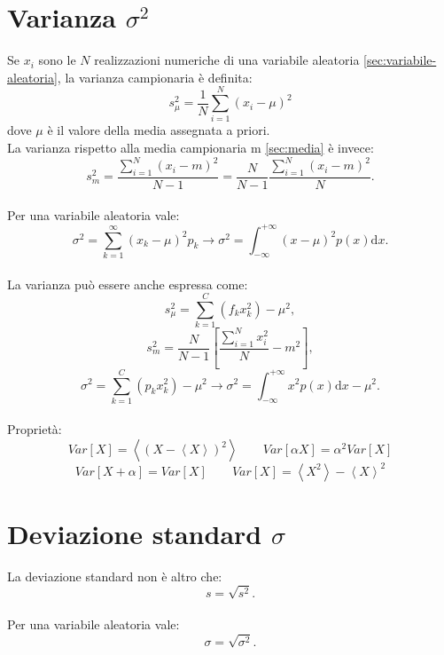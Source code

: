 \section{Varianza $\sigma^2$} %
\label{sec:varianza}
Se $x_{i}$ sono le $N$ realizzazioni numeriche di una variabile aleatoria \ref{sec:variabile-aleatoria}, la varianza campionaria è definita:
\begin{equation}
{ s }_{ \mu  }^{ 2 }=\frac { 1 }{ N } \sum _{ i=1 }^{ N }{ { ({ x }_{ i }-\mu ) }^{ 2 } }
\end{equation}
dove $\mu$ è il valore della media assegnata a priori. \\ La varianza rispetto alla media campionaria m \ref{sec:media} è invece:
\begin{equation}
{ s }_{ m }^{ 2 }=\frac { \sum _{ i=1 }^{ N }{ { ({ x }_{ i }-m) }^{ 2 } }  }{ N-1 } =\frac { N }{ N-1 } \frac { \sum _{ i=1 }^{ N }{ { ({ x }_{ i }-m) }^{ 2 } }  }{ N } .
\end{equation}
\\ Per una variabile aleatoria vale:
\begin{equation}
{ \sigma  }^{ 2 }=\sum _{ k=1 }^{ \infty  }{ { ({ x }_{ k }-\mu ) }^{ 2 }{ p }_{ k } } \rightarrow { \sigma  }^{ 2 }=\int _{ -\infty  }^{ +\infty  }{ { ({ x }-\mu ) }^{ 2 }{ p }(x)\textrm{d}x } .
\end{equation}
\\ La varianza può essere anche espressa come:
\begin{equation}
{ s }_{ \mu  }^{ 2 }=\sum _{ k=1 }^{ C }{ ({ f }_{ k }{ x }_{ k }^{ 2 }) } -{ \mu  }^{ 2 },
\end{equation}
\begin{equation}
{ s }_{ m }^{ 2 }=\frac { N }{ N-1 } \left[ \frac { \sum _{ i=1 }^{ N }{ { x }_{ i }^{ 2 } }  }{ N } -{ m }^{ 2 } \right],
\end{equation}
\begin{equation}
 { \sigma  }^{ 2 }=\sum _{ k=1 }^{ C }{ ({ p }_{ k }{ x }_{ k }^{ 2 }) } -{ \mu  }^{ 2 }\rightarrow { \sigma  }^{ 2 }=\int _{ -\infty  }^{ +\infty  }{ { x }^{ 2 }p(x)\textrm{d}x } -{ \mu  }^{ 2 }.
\end{equation}
\\ Proprietà:
\[
Var[X]=\left< { \left( X-\left< X \right>  \right)  }^{ 2 } \right> \qquad Var\left[ \alpha X \right] ={ \alpha  }^{ 2 }Var\left[ X \right] 
\]
\[
Var\left[ X+\alpha  \right] =Var\left[ X \right] \qquad Var[X]=\left< { X }^{ 2 } \right> -{ \left< X \right>  }^{ 2 }
\]

\section{Deviazione standard $\sigma$} %
\label{sec:deviazione-standard}
La deviazione standard non è altro che:
\begin{equation}
s=\sqrt { { s }^{ 2 } } .
\end{equation}
\\ Per una variabile aleatoria vale:
\begin{equation}
\sigma =\sqrt { { \sigma  }^{ 2 } } .
\end{equation}